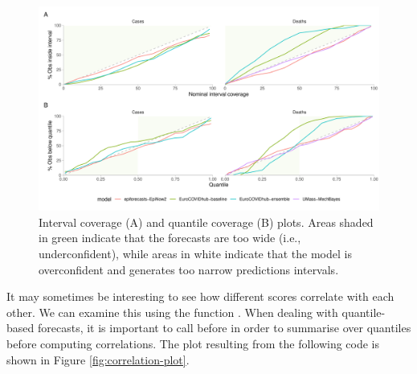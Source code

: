 \documentclass[
]{jss}
\begin{document}
\begin{CodeChunk}
\begin{figure}[!h]

{\centering \includegraphics[width=1\linewidth]{manuscript_files/figure-latex/coverage-1}

}

\caption[Interval coverage (A) and quantile coverage (B) plots]{Interval coverage (A) and quantile coverage (B) plots. Areas shaded in green indicate that the forecasts are too wide (i.e., underconfident), while areas in white indicate that the model is overconfident and generates too narrow predictions intervals.}\label{fig:coverage}
\end{figure}
\end{CodeChunk}

It may sometimes be interesting to see how different scores correlate
with each other. We can examine this using the function
. When dealing with quantile-based forecasts, it is
important to call  before 
in order to summarise over quantiles before computing correlations. The
plot resulting from the following code is shown in Figure
\ref{fig:correlation-plot}.
\end{document}
